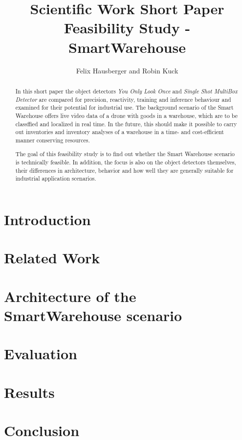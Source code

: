 \documentclass[a4paper, 10pt, journal]{wissarbIEEE}      %
\title{\LARGE \bf Scientific Work Short Paper \\Feasibility Study - SmartWarehouse}
\author{Felix Hausberger and Robin Kuck}
\begin{document}
\maketitle

\begin{abstract}

In this short paper the object detectors \textit{You Only Look Once} and \textit{Single Shot MultiBox Detector} are compared for precision, reactivity, training and inference behaviour and examined for their potential for industrial use. The background scenario of the Smart Warehouse offers live video data of a drone with goods in a warehouse, which are to be classffied and localized in real time. In the future, this should make it possible to carry out inventories and inventory analyses of a warehouse in a time- and cost-efficient manner conserving resources.

The goal of this feasibility study is to find out whether the Smart Warehouse scenario is technically feasible. In addition, the focus is also on the object detectors themselves, their differences in architecture, behavior and how well they are generally suitable for industrial application scenarios.

\end{abstract}

\section{Introduction}

\section{Related Work}

\section{Architecture of the SmartWarehouse scenario}

\section{Evaluation}

\section{Results}

\section{Conclusion}


\end{document}
